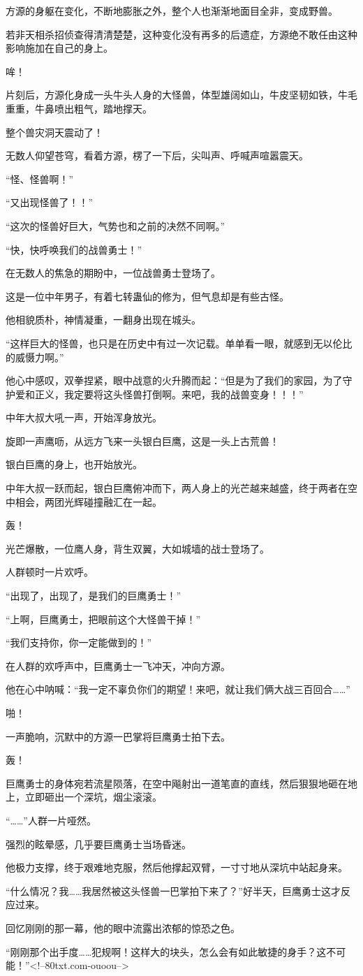 \begin{this_body}
方源的身躯在变化，不断地膨胀之外，整个人也渐渐地面目全非，变成野兽。

若非天相杀招侦查得清清楚楚，这种变化没有再多的后遗症，方源绝不敢任由这种影响施加在自己的身上。

哞！

片刻后，方源化身成一头牛头人身的大怪兽，体型雄阔如山，牛皮坚韧如铁，牛毛重重，牛鼻喷出粗气，踏地撑天。

整个兽灾洞天震动了！

无数人仰望苍穹，看着方源，楞了一下后，尖叫声、呼喊声喧嚣震天。

“怪、怪兽啊！”

“又出现怪兽了！！”

“这次的怪兽好巨大，气势也和之前的决然不同啊。”

“快，快呼唤我们的战兽勇士！”

在无数人的焦急的期盼中，一位战兽勇士登场了。

这是一位中年男子，有着七转蛊仙的修为，但气息却是有些古怪。

他相貌质朴，神情凝重，一翻身出现在城头。

“这样巨大的怪兽，也只是在历史中有过一次记载。单单看一眼，就感到无以伦比的威慑力啊。”

他心中感叹，双拳捏紧，眼中战意的火升腾而起：“但是为了我们的家园，为了守护爱和正义，我定要将这头怪兽打倒啊。来吧，我的战兽变身！！！”

中年大叔大吼一声，开始浑身放光。

旋即一声鹰呖，从远方飞来一头银白巨鹰，这是一头上古荒兽！

银白巨鹰的身上，也开始放光。

中年大叔一跃而起，银白巨鹰俯冲而下，两人身上的光芒越来越盛，终于两者在空中相会，两团光辉碰撞融汇在一起。

轰！

光芒爆散，一位鹰人身，背生双翼，大如城墙的战士登场了。

人群顿时一片欢呼。

“出现了，出现了，是我们的巨鹰勇士！”

“上啊，巨鹰勇士，把眼前这个大怪兽干掉！”

“我们支持你，你一定能做到的！”

在人群的欢呼声中，巨鹰勇士一飞冲天，冲向方源。

他在心中呐喊：“我一定不辜负你们的期望！来吧，就让我们俩大战三百回合……”

啪！

一声脆响，沉默中的方源一巴掌将巨鹰勇士拍下去。

轰！

巨鹰勇士的身体宛若流星陨落，在空中飚射出一道笔直的直线，然后狠狠地砸在地上，立即砸出一个深坑，烟尘滚滚。

“……”人群一片哑然。

强烈的眩晕感，几乎要巨鹰勇士当场昏迷。

他极力支撑，终于艰难地克服，然后他撑起双臂，一寸寸地从深坑中站起身来。

“什么情况？我……我居然被这头怪兽一巴掌拍下来了？”好半天，巨鹰勇士这才反应过来。

回忆刚刚的那一幕，他的眼中流露出浓郁的惊恐之色。

“刚刚那个出手度……犯规啊！这样大的块头，怎么会有如此敏捷的身手？这不可能！”<!--80txt.com-ouoou-->

\end{this_body}

